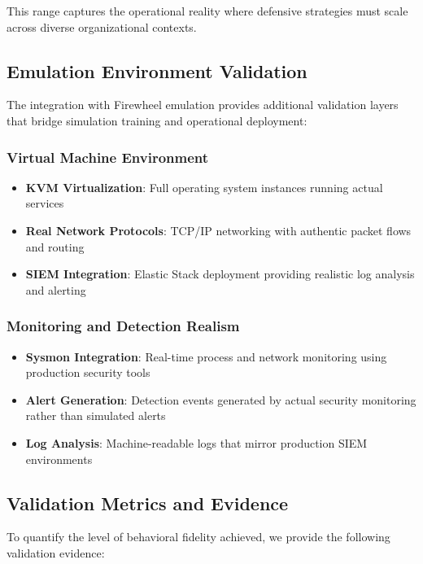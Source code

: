 This range captures the operational reality where defensive strategies must scale across diverse organizational contexts.

\subsection{Emulation Environment Validation}

The integration with Firewheel emulation provides additional validation layers that bridge simulation training and operational deployment:

\subsubsection{Virtual Machine Environment}

\begin{itemize}
    \item \textbf{KVM Virtualization}: Full operating system instances running actual services
    \item \textbf{Real Network Protocols}: TCP/IP networking with authentic packet flows and routing
    \item \textbf{SIEM Integration}: Elastic Stack deployment providing realistic log analysis and alerting
\end{itemize}

\subsubsection{Monitoring and Detection Realism}

\begin{itemize}
    \item \textbf{Sysmon Integration}: Real-time process and network monitoring using production security tools
    \item \textbf{Alert Generation}: Detection events generated by actual security monitoring rather than simulated alerts
    \item \textbf{Log Analysis}: Machine-readable logs that mirror production SIEM environments
\end{itemize}

\subsection{Validation Metrics and Evidence}

To quantify the level of behavioral fidelity achieved, we provide the following validation evidence:


